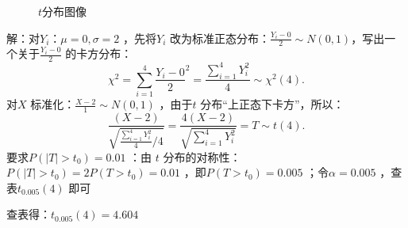 \begin{figure}[ht]
    \centering
    \caption{$t$分布图像}
    \label{fig:t分布图像}
\end{figure}
解：对$Y_{i}$：$\mu=0,\sigma=2$ ，先将$Y_{i}$ 改为标准正态分布：$\frac{Y_{i}-0}{2}\sim N\left( 0,1 \right)$，写出一个关于$\frac{Y_{i}-0}{2}$ 的卡方分布：\[
    \chi^2 =\sum_{i=1}^{4} \frac{Y_{i}-0}{2}^2 =\frac{\sum_{i=1}^{4} Y_{i}^2 }{4}\sim \chi^2 \left( 4 \right)
.\]
对$X$ 标准化：$\frac{X-2}{1}\sim N\left( 0,1 \right)$ ，由于$t$ 分布“上正态下卡方”，所以： \[
    \frac{\left( X-2 \right)}{\sqrt{\frac{\sum_{i=1}^{4} Y_{i}^2 }{4} /4}}=\frac{4\left( X-2 \right)}{\sqrt{\sum_{i=1}^{4} Y_{i}^2 }}=T\sim t\left( 4 \right)
.\]
要求$P\left( \left| T \right|>t_0 \right)=0.01$ ：由 $t$ 分布的对称性：$P\left( \left| T \right|>t_0 \right)=2P\left( T>t_0 \right)=0.01$ ，即$P\left( T>t_0 \right)=0.005$ ；令$\alpha=0.005$ ，查表$t_{0.005}\left( 4 \right)$ 即可

查表得：$t_{0.005}\left( 4 \right)=4.604$
